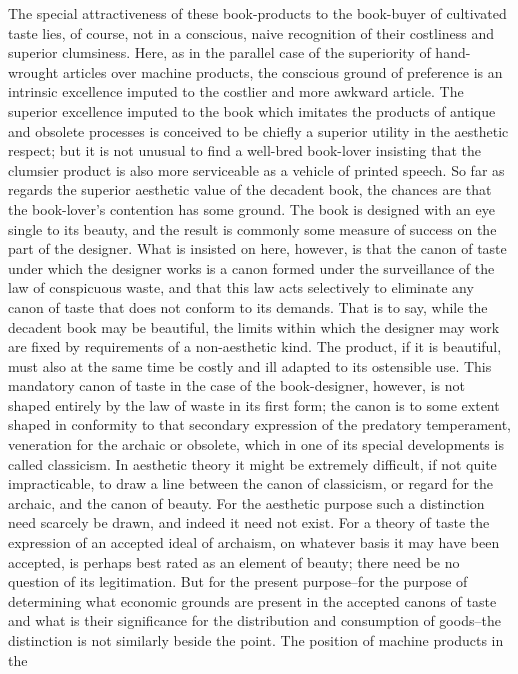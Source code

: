 \documentclass[12pt]{report}
\begin{document}
The special attractiveness of these book-products to the book-buyer of
cultivated taste lies, of course, not in a conscious, naive recognition
of their costliness and superior clumsiness. Here, as in the parallel
case of the superiority of hand-wrought articles over machine products,
the conscious ground of preference is an intrinsic excellence imputed to
the costlier and more awkward article. The superior excellence imputed
to the book which imitates the products of antique and obsolete
processes is conceived to be chiefly a superior utility in the aesthetic
respect; but it is not unusual to find a well-bred book-lover insisting
that the clumsier product is also more serviceable as a vehicle of
printed speech. So far as regards the superior aesthetic value of the
decadent book, the chances are that the book-lover's contention has some
ground. The book is designed with an eye single to its beauty, and the
result is commonly some measure of success on the part of the designer.
What is insisted on here, however, is that the canon of taste under
which the designer works is a canon formed under the surveillance of
the law of conspicuous waste, and that this law acts selectively to
eliminate any canon of taste that does not conform to its demands. That
is to say, while the decadent book may be beautiful, the limits within
which the designer may work are fixed by requirements of a non-aesthetic
kind. The product, if it is beautiful, must also at the same time be
costly and ill adapted to its ostensible use. This mandatory canon of
taste in the case of the book-designer, however, is not shaped entirely
by the law of waste in its first form; the canon is to some extent
shaped in conformity to that secondary expression of the predatory
temperament, veneration for the archaic or obsolete, which in one of its
special developments is called classicism. In aesthetic theory it might
be extremely difficult, if not quite impracticable, to draw a line
between the canon of classicism, or regard for the archaic, and the
canon of beauty. For the aesthetic purpose such a distinction need
scarcely be drawn, and indeed it need not exist. For a theory of taste
the expression of an accepted ideal of archaism, on whatever basis it
may have been accepted, is perhaps best rated as an element of beauty;
there need be no question of its legitimation. But for the present
purpose--for the purpose of determining what economic grounds are
present in the accepted canons of taste and what is their significance
for the distribution and consumption of goods--the distinction is not
similarly beside the point. The position of machine products in the
\end{document}
